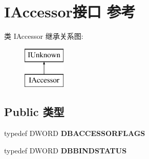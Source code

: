 \hypertarget{interface_i_accessor}{}\section{I\+Accessor接口 参考}
\label{interface_i_accessor}
类 I\+Accessor 继承关系图\+:\begin{figure}[H]
\begin{center}
\leavevmode
\includegraphics[height=2.000000cm]{interface_i_accessor}
\end{center}
\end{figure}
\subsection*{Public 类型}
\begin{DoxyCompactItemize}
\item 
\mbox{\label{interface_i_accessor_aaf896611a24c96781e6d2ed0187aaf17}} 
typedef D\+W\+O\+RD {\bfseries D\+B\+A\+C\+C\+E\+S\+S\+O\+R\+F\+L\+A\+GS}
\item 
\mbox{\label{interface_i_accessor_a63abfa579e7284af69a83397f6bb6202}} 
typedef D\+W\+O\+RD {\bfseries D\+B\+B\+I\+N\+D\+S\+T\+A\+T\+US}
\end{DoxyCompactItemize}
